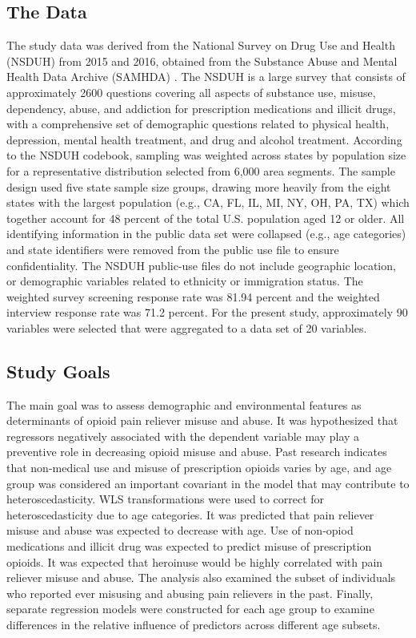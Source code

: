 \documentclass[sigconf]{acmart}
\begin{document}
\subsection{The Data} 

The study data was derived from the National Survey on Drug Use and Health 
(NSDUH) from 2015 and 2016, obtained from the Substance Abuse and Mental Health 
Data Archive (SAMHDA) \cite{samhsa16}. The NSDUH is a large survey that consists
of approximately 2600 questions covering all aspects of substance use, misuse, 
dependency, abuse, and addiction for prescription medications and illicit drugs, 
with a comprehensive set of demographic questions related to physical health, 
depression, mental health treatment, and drug and alcohol treatment. According 
to the NSDUH codebook, sampling was weighted across states by population size 
for a representative distribution selected from 6,000 area segments. The sample 
design used five state sample size groups, drawing more heavily from the eight 
states with the largest population (e.g., CA, FL, IL, MI, NY, OH, PA, TX) which 
together account for 48 percent of the total U.S. population aged 12 or older.  
All identifying information in the public data set were collapsed (e.g., age 
categories) and state identifiers were removed from the public use file to 
ensure confidentiality. The NSDUH public-use files do not include geographic 
location, or demographic variables related to ethnicity or immigration status. 
The weighted survey screening response rate was 81.94 percent and the weighted 
interview response rate was 71.2 percent. For the present study, approximately
90 variables were selected that were aggregated to a data set of 20 variables. 


\subsection{Study Goals} 

The main goal was to assess demographic and environmental features as 
determinants of opioid pain reliever misuse and abuse. It was hypothesized 
that regressors negatively associated with the dependent variable may play a 
preventive role in decreasing opioid misuse and abuse. Past research indicates
that non-medical use and misuse of prescription opioids varies by age, and 
age group was considered an important covariant in the model that may 
contribute to heteroscedasticity. WLS transformations were used to correct for
heteroscedasticity due to age categories. It was predicted that pain reliever 
misuse and abuse was expected to decrease with age. Use of non-opiod medications
and illicit drug was expected to predict misuse of prescription opioids. It
was expected that heroinuse would be highly correlated with pain reliever 
misuse and abuse. The analysis also examined the subset of individuals who 
reported ever misusing and abusing pain relievers in the past. Finally, separate 
regression models were constructed for each age group to examine differences 
in the relative influence of predictors across different age subsets. 
\end{document}
